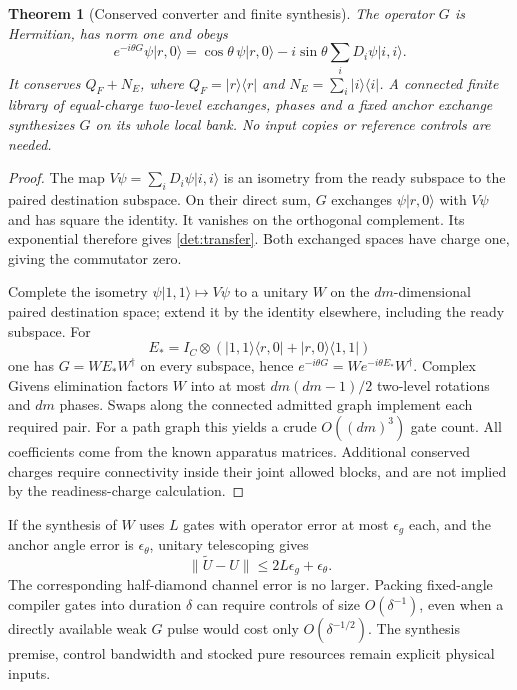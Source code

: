 \documentclass[11pt,oneside,openany]{book}
\newtheorem{theorem}{Theorem}[chapter]
\theoremstyle{definition}
\theoremstyle{remark}\newtheorem{remark}[theorem]{Remark}
\begin{document}
\begin{theorem}[Conserved converter and finite synthesis]
\label{det:converter-theorem}
The operator $G$ is Hermitian, has norm one and obeys
\begin{equation}
 e^{-i\theta G}\psi|r,0\rangle
  =\cos\theta\,\psi|r,0\rangle
      -i\sin\theta\sum_iD_i\psi|i,i\rangle.      \label{det:transfer}
\end{equation}
It conserves $Q_F+N_E$, where $Q_F=|r\rangle\langle r|$ and
$N_E=\sum_i|i\rangle\langle i|$. A connected finite library of
equal-charge two-level exchanges, phases and a fixed anchor exchange
synthesizes $G$ on its whole local bank. No input copies or reference
controls are needed.
\end{theorem}
\begin{proof}
The map $V\psi=\sum_iD_i\psi|i,i\rangle$ is an isometry from the
ready subspace to the paired destination subspace. On their direct
sum, $G$ exchanges $\psi|r,0\rangle$ with $V\psi$ and has square
the identity. It vanishes on the orthogonal complement. Its exponential
therefore gives \eqref{det:transfer}. Both exchanged spaces have
charge one, giving the commutator zero.

Complete the isometry $\psi|1,1\rangle\mapsto V\psi$ to a unitary
$W$ on the $dm$-dimensional paired destination space; extend it by the
identity elsewhere, including the ready subspace. For
\[
 E_*=I_C\otimes(|1,1\rangle\langle r,0|+
                         |r,0\rangle\langle1,1|)
\]
one has $G=WE_*W^\dagger$ on every subspace, hence
$e^{-i\theta G}=We^{-i\theta E_*}W^\dagger$.
Complex Givens elimination factors $W$ into at most
$dm(dm-1)/2$ two-level rotations and $dm$ phases. Swaps along the
connected admitted graph implement each required pair. For a path
graph this yields a crude $O((dm)^3)$ gate count. All coefficients
come from the known apparatus matrices. Additional conserved charges
require connectivity inside their joint allowed blocks, and are not
implied by the readiness-charge calculation.
\end{proof}

If the synthesis of $W$ uses $L$ gates with operator error at most
$\epsilon_g$ each, and the anchor angle error is $\epsilon_\theta$,
unitary telescoping gives
\begin{equation}
 \|\widetilde U-U\|\le2L\epsilon_g+\epsilon_\theta.            \label{det:gate-error}
\end{equation}
The corresponding half-diamond channel error is no larger. Packing
fixed-angle compiler gates into duration $\delta$ can require controls
of size $O(\delta^{-1})$, even when a directly available weak $G$ pulse
would cost only $O(\delta^{-1/2})$. The synthesis premise, control
bandwidth and stocked pure resources remain explicit physical inputs.
\end{document}
